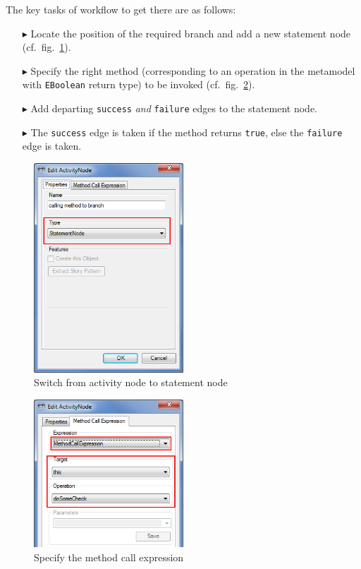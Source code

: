 The key tasks of workflow to get there are as follows:

\begin{enumerate}
\item[$\blacktriangleright$] Locate the position of the required branch and add a new statement node (cf.~fig.~\ref{fig:cond_statement_node}).
\item[$\blacktriangleright$] Specify the right method (corresponding to an operation in the metamodel with \texttt{EBoolean} return type) to be invoked (cf.~fig.~\ref{fig:cond_method_call}). 
\item[$\blacktriangleright$] Add departing \texttt{success} \emph{and} \texttt{failure} edges to the statement node.
\item[$\blacktriangleright$] The \texttt{success} edge is taken if the method returns \texttt{true}, else the \texttt{failure} edge is taken.
\end{enumerate}

\begin{figure}[htp]
\begin{center}
  \includegraphics[width=0.5\textwidth]{pics/advancedTopics/branching/01_switch_to_statement_node}
  \caption{Switch from activity node to statement node}
  \label{fig:cond_statement_node}
\end{center}
\end{figure}

\begin{figure}[htp]
\begin{center}
  \includegraphics[width=0.5\textwidth]{pics/advancedTopics/branching/02_specify_method_call_expression}
  \caption{Specify the method call expression}
  \label{fig:cond_method_call}
\end{center}
\end{figure}